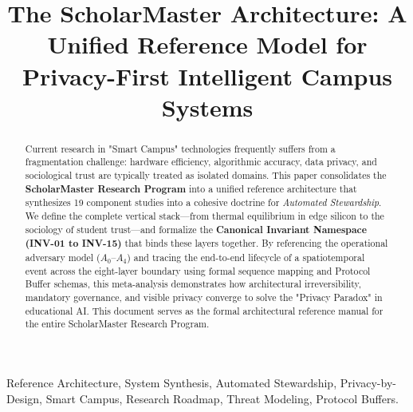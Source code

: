 \documentclass[conference]{IEEEtran}
\begin{document}
\title{The ScholarMaster Architecture: A Unified Reference Model for Privacy-First Intelligent Campus Systems}

\author{
}

\maketitle

\begin{abstract}
Current research in "Smart Campus" technologies frequently suffers from a fragmentation challenge: hardware efficiency, algorithmic accuracy, data privacy, and sociological trust are typically treated as isolated domains. This paper consolidates the \textbf{ScholarMaster Research Program} into a unified reference architecture that synthesizes 19 component studies into a cohesive doctrine for \textit{Automated Stewardship}. We define the complete vertical stack—from thermal equilibrium in edge silicon to the sociology of student trust—and formalize the \textbf{Canonical Invariant Namespace (INV-01 to INV-15)} that binds these layers together. By referencing the operational adversary model ($A_0$--$A_4$) and tracing the end-to-end lifecycle of a spatiotemporal event across the eight-layer boundary using formal sequence mapping and Protocol Buffer schemas, this meta-analysis demonstrates how architectural irreversibility, mandatory governance, and visible privacy converge to solve the "Privacy Paradox" in educational AI. This document serves as the formal architectural reference manual for the entire ScholarMaster Research Program.
\end{abstract}

\begin{IEEEkeywords}
Reference Architecture, System Synthesis, Automated Stewardship, Privacy-by-Design, Smart Campus, Research Roadmap, Threat Modeling, Protocol Buffers.
\end{IEEEkeywords}
\end{document}
